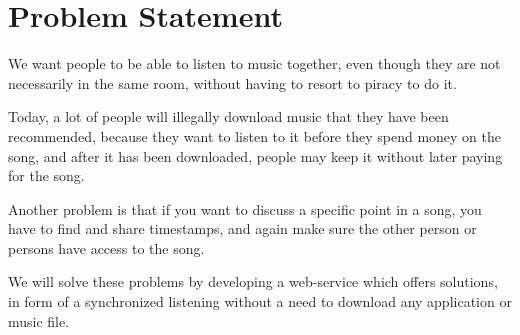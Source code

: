 \section{Problem Statement}
We want people to be able to listen to music together, even though they are
not necessarily in the same room, without having to resort to piracy to do it.

\vspace{10pt}
Today, a lot of people will illegally download music that they have been
recommended, because they want to listen to it before they spend money
on the song, and after it has been downloaded, people may keep it without
later paying for the song.

Another problem is that if you want to discuss a specific point in a song,
you have to find and share timestamps, and again make sure the other person
or persons have access to the song.

\vspace{10pt}
We will solve these problems by developing a web-service which offers
solutions, in form of a synchronized listening without a need to download
any application or music file.